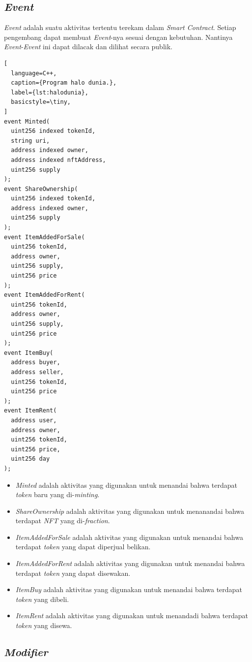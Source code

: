 \subsection{\emph{Event}}

\emph{Event} adalah suatu aktivitas tertentu terekam dalam \emph{Smart Contract}. Setiap pengembang dapat membuat \emph{Event}-nya sesuai dengan kebutuhan. Nantinya \emph{Event}-\emph{Event} ini dapat dilacak dan dilihat secara publik. 

\begin{lstlisting}[
  language=C++,
  caption={Program halo dunia.},
  label={lst:halodunia},
  basicstyle=\tiny,
]
event Minted(
  uint256 indexed tokenId,
  string uri,
  address indexed owner,
  address indexed nftAddress,
  uint256 supply
);
event ShareOwnership(
  uint256 indexed tokenId,
  address indexed owner,
  uint256 supply
);
event ItemAddedForSale(
  uint256 tokenId,
  address owner,
  uint256 supply,
  uint256 price
);
event ItemAddedForRent(
  uint256 tokenId,
  address owner,
  uint256 supply,
  uint256 price
);
event ItemBuy(
  address buyer,
  address seller,
  uint256 tokenId,
  uint256 price
); 
event ItemRent(
  address user,
  address owner,
  uint256 tokenId,
  uint256 price,
  uint256 day
); 
\end{lstlisting}

\begin{itemize}
  \item \emph{Minted} adalah aktivitas yang digunakan untuk menandai bahwa terdapat \emph{token} baru yang di-\emph{minting}.
  \item \emph{ShareOwnership} adalah aktivitas yang digunakan untuk menanandai bahwa terdapat \emph{NFT} yang di-\emph{fraction}.
  \item \emph{ItemAddedForSale} adalah aktivitas yang digunakan untuk menandai bahwa terdapat \emph{token} yang dapat diperjual belikan.
  \item \emph{ItemAddedForRent} adalah aktivitas yang digunakan untuk menandai bahwa terdapat \emph{token} yang dapat disewakan.
  \item \emph{ItemBuy} adalah aktivitas yang digunakan untuk menandai bahwa terdapat \emph{token} yang dibeli. 
  \item \emph{ItemRent} adalah aktivitas yang digunakan untuk menandadi bahwa terdapat \emph{token} yang disewa.
\end{itemize}

\subsection{\emph{Modifier}}

